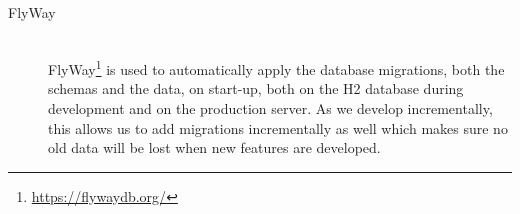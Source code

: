 \begin{description}
    \item[FlyWay] \hfill \\
        FlyWay\footnote{\url{https://flywaydb.org/}} is used to automatically apply the database migrations, both the schemas and the data, on start-up, both on the H2 database during development and on the production server.
        As we develop incrementally, this allows us to add migrations incrementally as well which makes sure no old data will be lost when new features are developed.
\end{description}
